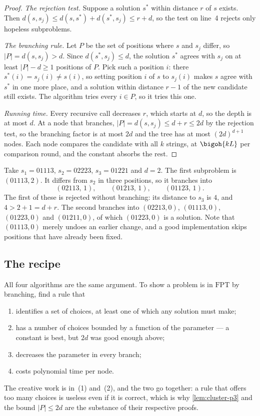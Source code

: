 \begin{proof}
\emph{The rejection test.} Suppose a solution $s^{*}$ within distance $r$ of $s$
exists. Then $d(s,s_j) \le d(s,s^{*}) + d(s^{*},s_j) \le r + d$, so the test on
line~4 rejects only hopeless subproblems.

\emph{The branching rule.} Let $P$ be the set of positions where $s$ and $s_j$
differ, so $|P| = d(s,s_j) > d$. Since $d(s^{*},s_j) \le d$, the solution
$s^{*}$ agrees with $s_j$ on at least $|P| - d \ge 1$ positions of $P$. Pick
such a position $i$: there $s^{*}(i) = s_j(i) \ne s(i)$, so setting position $i$
of $s$ to $s_j(i)$ makes $s$ agree with $s^{*}$ in one more place, and a
solution within distance $r-1$ of the new candidate still exists. The algorithm
tries every $i \in P$, so it tries this one.

\emph{Running time.} Every recursive call decreases $r$, which starts at $d$, so
the depth is at most $d$. At a node that branches, $|P| = d(s,s_j) \le d+r \le
2d$ by the rejection test, so the branching factor is at most $2d$ and the tree
has at most $(2d)^{d+1}$ nodes. Each node compares the candidate with all $k$
strings, at $\bigoh{kL}$ per comparison round, and the constant absorbs the
rest.
\end{proof}

\begin{example}\label{ex:closest-string}
Take $s_1 = 01113$, $s_2 = 02223$, $s_3 = 01221$ and $d = 2$. The first
subproblem is $(01113, 2)$. It differs from $s_2$ in three positions, so it
branches into
\[ (02113,\,1), \qquad (01213,\,1), \qquad (01123,\,1). \]
The first of these is rejected without branching: its distance to $s_3$ is $4$,
and $4 > 2 + 1 = d + r$. The second branches into $(02213,0)$, $(01113,0)$,
$(01223,0)$ and $(01211,0)$, of which $(01223,0)$ is a solution. Note that
$(01113,0)$ merely undoes an earlier change, and a good implementation skips
positions that have already been fixed.
\end{example}

\subsection{The recipe}
\label{sec:fpt-branching-recipe}

All four algorithms are the same argument. To show a problem is in
$\mathrm{FPT}$ by branching, find a rule that
\begin{enumerate}[leftmargin=*,nosep]
  \item identifies a set of choices, at least one of which any solution must
        make;
  \item has a number of choices bounded by a function of the parameter --- a
        constant is best, but $2d$ was good enough above;
  \item decreases the parameter in every branch;
  \item costs polynomial time per node.
\end{enumerate}
The creative work is in~(1) and~(2), and the two go together: a rule that offers
too many choices is useless even if it is correct, which is why
\cref{lem:cluster-p3} and the bound $|P| \le 2d$ are the substance of their
respective proofs.

